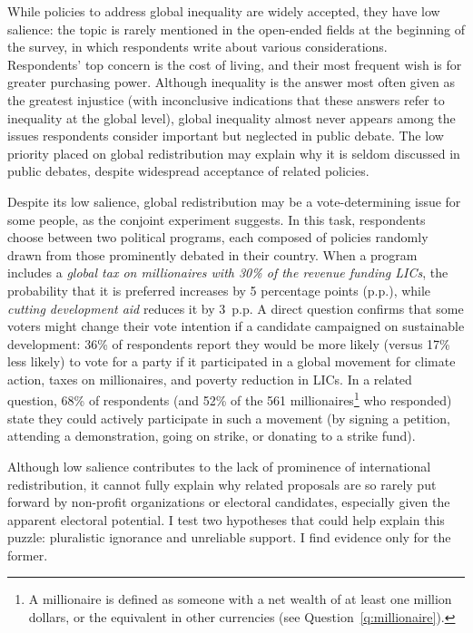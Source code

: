 \documentclass[12pt,english]{article}
\begin{document}
While policies to address global inequality are widely accepted, they have low salience: the topic is rarely mentioned in the open-ended fields at the beginning of the survey, in which respondents write about various considerations. Respondents' top concern is the cost of living, and their most frequent wish is for greater purchasing power. Although inequality is the answer most often given as the greatest injustice (with inconclusive indications that these answers refer to inequality at the global level), global inequality almost never appears among the issues respondents consider important but neglected in public debate. The low priority placed on global redistribution may explain why it is seldom discussed in public debates, despite widespread acceptance of related policies.

Despite its low salience, global redistribution may be a vote-determining issue for some people, as %
the conjoint experiment suggests. 
In this task, respondents choose between two political programs, each composed of policies randomly drawn from those prominently debated in their country. When a program includes a \textit{global tax on millionaires with 30\% of the revenue funding LICs}, the probability that it is preferred increases by 5 percentage points (p.p.), while \textit{cutting development aid} reduces it by 3~p.p.  A direct question confirms that some voters might change their vote intention if a candidate campaigned on sustainable development: 36\% of respondents report they would be more likely (versus 17\% less likely) to vote for a party if it participated in a global movement for climate action, taxes on millionaires, and poverty reduction in LICs. In a related question, 68\% of respondents (and 52\% of the 561 millionaires\footnote{A millionaire is defined as someone with a net wealth of at least one million dollars, or the equivalent in other currencies (see Question~\ref{q:millionaire}).} %
who responded) state they could actively participate in such a movement (by signing a petition, attending a demonstration, going on strike, or donating to a strike fund). 

Although low salience contributes to the lack of prominence of international redistribution, it cannot fully explain why related proposals are so rarely put forward by non-profit organizations or electoral candidates, especially given the apparent electoral potential. I test two hypotheses that could help explain this puzzle: pluralistic ignorance and unreliable support. I find evidence only for the former.
\end{document}
